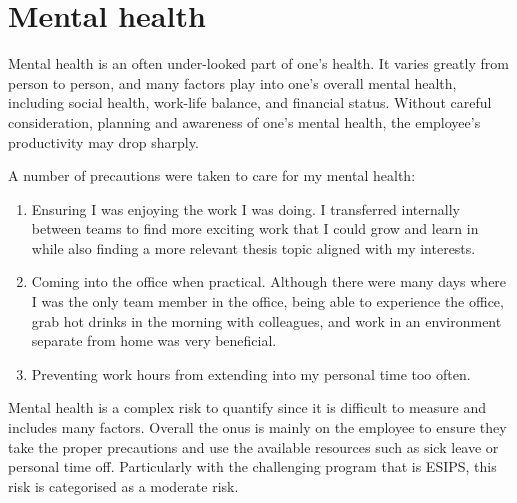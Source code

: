 \section{Mental health}
Mental health is an often under-looked part of one's health. It varies greatly from person to person, and many factors play into one's overall mental health, including social health, work-life balance, and financial status. Without careful consideration, planning and awareness of one's mental health, the employee's productivity may drop sharply. 

A number of precautions were taken to care for my mental health:
\begin{enumerate}
  \item Ensuring I was enjoying the work I was doing. I transferred internally between teams to find more exciting work that I could grow and learn in while also finding a more relevant thesis topic aligned with my interests. 
  \item Coming into the office when practical. Although there were many days where I was the only team member in the office, being able to experience the office, grab hot drinks in the morning with colleagues, and work in an environment separate from home was very beneficial.
  \item Preventing work hours from extending into my personal time too often. 
\end{enumerate}

Mental health is a complex risk to quantify since it is difficult to measure and includes many factors. Overall the onus is mainly on the employee to ensure they take the proper precautions and use the available resources such as sick leave or personal time off. Particularly with the challenging program that is ESIPS, this risk is categorised as a moderate risk. 
